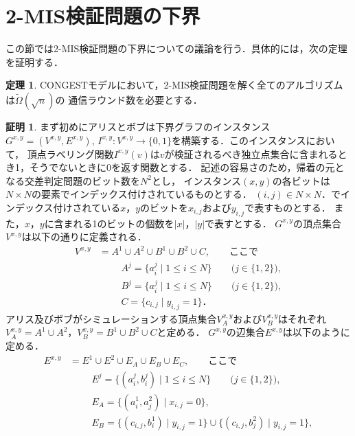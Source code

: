 \documentclass[12pt]{thesis}
\newcommand{\CONGEST}{\textsf{CONGEST}}
\theoremstyle{definition}
\newtheorem{theorem}{定理}[chapter]
\newtheorem*{prf*}{証明}
\begin{document}
\section{2-MIS検証問題の下界}
この節では2-MIS検証問題の下界についての議論を行う．具体的には，次の定理を証明する．
\begin{theorem}
{\CONGEST}モデルにおいて，2-MIS検証問題を解く全てのアルゴリズムは$\tilde{\Omega} (\sqrt{n})$の
通信ラウンド数を必要とする．
\end{theorem}
\begin{prf*}
まず初めにアリスとボブは下界グラフのインスタンス$G^{x,y} = (V^{x,y}, E^{x,y})$, 
$I^{x,y} : V^{x,y} \to \{0, 1\}$を構築する．このインスタンスにおいて，
頂点ラベリング関数$I^{x,y}(v)$は$v$が検証されるべき独立点集合に含まれるとき1，そうでないときに0を返す関数とする．
記述の容易さのため，帰着の元となる交差判定問題のビット数を$N^2$とし，
インスタンス$(x, y)$の各ビットは$N\times N$の要素でインデックス付けされているものとする．
$(i, j) \in N \times N$．でインデックス付けされている$x$，$y$のビットを$x_{i,j}$および$y_{i,j}$で表すものとする．
また，$x$，$y$に含まれる1のビットの個数を$|x|$，$|y|$で表すとする．
$G^{x,y}$の頂点集合$V^{x,y}$は以下の通りに定義される．
\begin{align*}
V^{x,y} &= A^{1} \cup A^{2} \cup B^{1} \cup B^{2} \cup C, \quad \quad \text{ここで}\\
&\phantom{=} \quad A^{j} = \{a^{j}_{i} \mid 1\leq i \leq N\} \quad \quad \text{($j \in \{1, 2\}$)}, \\
&\phantom{=} \quad B^{j} = \{a^{j}_{i} \mid 1\leq i \leq N\} \quad \quad \text{($j \in \{1, 2\}$)}, \\
&\phantom{=} \quad C = \{c_{i,j} \mid y_{i,j} = 1\}．
\end{align*}
アリス及びボブがシミュレーションする頂点集合$V^{x,y}_{A}$および$V^{x,y}_{B}$はそれぞれ
$V^{x,y}_{A} = A^{1} \cup A^{2}$，$V^{x,y}_{B} = B^{1} \cup B^{2} \cup C$と定める．
$G^{x,y}$の辺集合$E^{x,y}$は以下のように定める．
\begin{align*}
E^{x,y} &= E^{1} \cup E^{2} \cup E_{A} \cup E_{B} \cup E_{C}, \quad \quad \text{ここで}\\
&\phantom{=} \quad E^{j} = \{(a^{j}_{i}, b^{j}_{i}) \mid 1\leq i \leq N\} \quad \quad \text{($j \in \{1, 2\}$)}, \\
&\phantom{=} \quad E_{A} = \{(a^{1}_{i},a^{2}_{j}) \mid x_{i,j}=0\}, \\
&\phantom{=} \quad E_{B} = \{(c_{i,j},b^{1}_{i}) \mid y_{i,j}=1\} \cup \{(c_{i,j},b^{2}_{j}) \mid y_{i,j}=1\}, \\

\end{align*}
\end{prf*}
\end{document}
